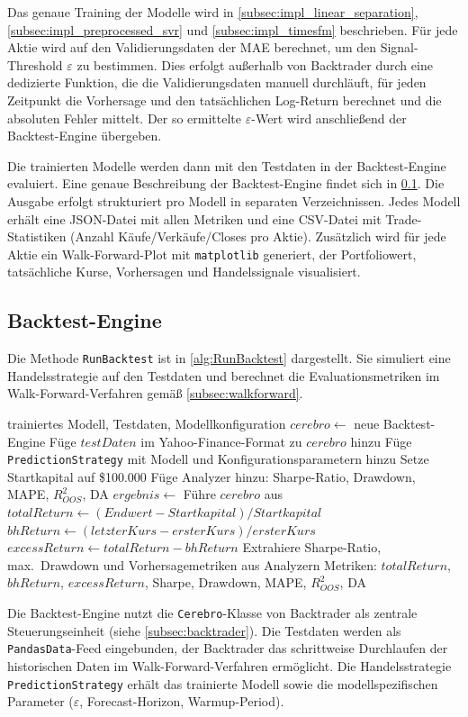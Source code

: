 Das genaue Training der Modelle wird in \cref{subsec:impl_linear_separation}, \cref{subsec:impl_preprocessed_svr} und \cref{subsec:impl_timesfm} beschrieben. Für jede Aktie wird auf den Validierungsdaten der \ac{MAE} berechnet, um den Signal-Threshold $\varepsilon$ zu bestimmen. Dies erfolgt außerhalb von Backtrader durch eine dedizierte Funktion, die die Validierungsdaten manuell durchläuft, für jeden Zeitpunkt die Vorhersage und den tatsächlichen Log-Return berechnet und die absoluten Fehler mittelt. Der so ermittelte $\varepsilon$-Wert wird anschließend der Backtest-Engine übergeben.

Die trainierten Modelle werden dann mit den Testdaten in der Backtest-Engine evaluiert. Eine genaue Beschreibung der Backtest-Engine findet sich in \cref{subsec:impl_backtest}. Die Ausgabe erfolgt strukturiert pro Modell in separaten Verzeichnissen. Jedes Modell erhält eine JSON-Datei mit allen Metriken und eine CSV-Datei mit Trade-Statistiken (Anzahl Käufe/Verkäufe/Closes pro Aktie). Zusätzlich wird für jede Aktie ein Walk-Forward-Plot mit \texttt{matplotlib} generiert, der Portfoliowert, tatsächliche Kurse, Vorhersagen und Handelssignale visualisiert.

\subsection{Backtest-Engine}\label{subsec:impl_backtest}
Die Methode \texttt{RunBacktest} ist in \cref{alg:RunBacktest} dargestellt. Sie simuliert eine Handelsstrategie auf den Testdaten und berechnet die Evaluationsmetriken im Walk-Forward-Verfahren gemäß \cref{subsec:walkforward}.
\begin{algorithm}
    \caption{RunBacktest Methode}\label{alg:RunBacktest}
    \small
    \begin{algorithmic}[1]
        \Require trainiertes Modell, Testdaten, Modellkonfiguration
        \State $cerebro \gets$ neue Backtest-Engine
        \State Füge $testDaten$ im Yahoo-Finance-Format zu $cerebro$ hinzu
        \State Füge \texttt{PredictionStrategy} mit Modell und Konfigurationsparametern hinzu
        \State Setze Startkapital auf \$100.000
        \State Füge Analyzer hinzu: Sharpe-Ratio, Drawdown, MAPE, $R^2_{OOS}$, DA
        \State $ergebnis \gets$ Führe $cerebro$ aus
        \State $totalReturn \gets (Endwert - Startkapital) / Startkapital$
        \State $bhReturn \gets (letzterKurs - ersterKurs) / ersterKurs$
        \State $excessReturn \gets totalReturn - bhReturn$
        \State Extrahiere Sharpe-Ratio, max.\ Drawdown und Vorhersagemetriken aus Analyzern
        \State \Return Metriken: $totalReturn$, $bhReturn$, $excessReturn$, Sharpe, Drawdown, MAPE, $R^2_{OOS}$, DA
    \end{algorithmic}
\end{algorithm}
Die Backtest-Engine nutzt die \texttt{Cerebro}-Klasse von Backtrader als zentrale Steuerungseinheit (siehe \cref{subsec:backtrader}). Die Testdaten werden als \texttt{PandasData}-Feed eingebunden, der Backtrader das schrittweise Durchlaufen der historischen Daten im Walk-Forward-Verfahren ermöglicht. Die Handelsstrategie \texttt{PredictionStrategy} erhält das trainierte Modell sowie die modellspezifischen Parameter ($\varepsilon$, Forecast-Horizon, Warmup-Period).

